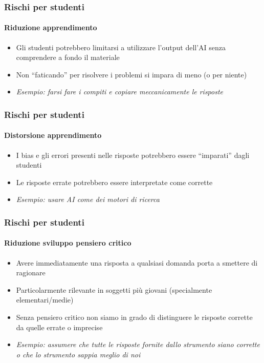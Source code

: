 \begin{contentframe}
    \frametitle{Rischi per studenti}
    \framesubtitle{Riduzione apprendimento}

    \begin{itemize}
        \item Gli studenti potrebbero limitarsi a utilizzare l'output dell'AI senza comprendere a fondo il materiale

        \bigskip
        \item Non ``faticando'' per risolvere i problemi si impara di meno (o per niente)

        \bigskip
        \item \textit{Esempio: farsi fare i compiti e copiare meccanicamente le risposte}
    \end{itemize}
\end{contentframe}

\begin{contentframe}
    \frametitle{Rischi per studenti}
    \framesubtitle{Distorsione apprendimento}

    \begin{itemize}
        \item I bias e gli errori presenti nelle risposte potrebbero essere ``imparati'' dagli studenti

        \bigskip
        \item Le risposte errate potrebbero essere interpretate come corrette

        \bigskip
        \item \textit{Esempio: usare AI come dei motori di ricerca}
    \end{itemize}
\end{contentframe}

\begin{contentframe}
    \frametitle{Rischi per studenti}
    \framesubtitle{Riduzione sviluppo pensiero critico}

    \begin{itemize}
        \item Avere immediatamente una risposta a qualsiasi domanda porta a smettere di ragionare
        \item Particolarmente rilevante in soggetti più giovani (specialmente elementari/medie)

        \bigskip
        \item Senza pensiero critico non siamo in grado di distinguere le risposte corrette da quelle errate o imprecise

        \bigskip
        \item \textit{Esempio: assumere che tutte le risposte fornite dallo strumento siano corrette o che lo strumento sappia meglio di noi}
    \end{itemize}
\end{contentframe}

